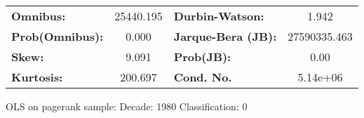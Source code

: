 \begin{center}
\begin{tabular}{lccccc}
\bottomrule
\end{tabular}
\begin{tabular}{lclc}
\textbf{Omnibus:}       & 25440.195 & \textbf{  Durbin-Watson:     } &      1.942    \\
\textbf{Prob(Omnibus):} &    0.000  & \textbf{  Jarque-Bera (JB):  } & 27590335.463  \\
\textbf{Skew:}          &    9.091  & \textbf{  Prob(JB):          } &       0.00    \\
\textbf{Kurtosis:}      &  200.697  & \textbf{  Cond. No.          } &   5.14e+06    \\
\bottomrule
\end{tabular}
\end{center}
\break
OLS on pagerank sample: Decade: 1980 Classification: 0
